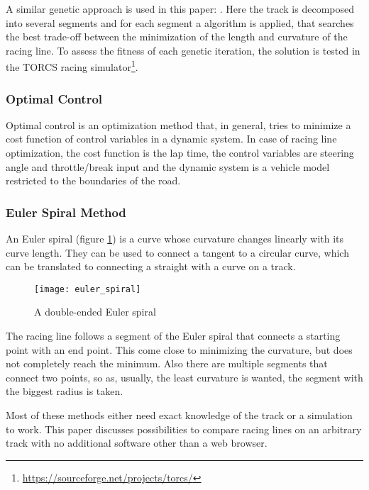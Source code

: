 A similar genetic approach is used in this paper: \cite{cardamone10}. Here the track is decomposed into several segments and for each segment a algorithm is applied, that searches the best trade-off between the minimization of the length and curvature of the racing line. To assess the fitness of each genetic iteration, the solution is tested in the TORCS racing simulator\footnote{\url{https://sourceforge.net/projects/torcs/}}.

\subsubsection{Optimal Control}
Optimal control is an optimization method that, in general, tries to minimize a cost function of control variables in a dynamic system. In case of racing line optimization, the cost function is the lap time, the control variables are steering angle and throttle/break input and the dynamic system is a vehicle model restricted to the boundaries of the road. \cite{gustafsson08,brayshaw05}

\subsubsection{Euler Spiral Method}
An Euler spiral (figure \ref{fig:euler_spiral}) is a curve whose curvature changes linearly with its curve length. They can be used to connect a tangent to a circular curve, which can be translated to connecting a straight with a curve on a track.\\ \cite{xiong09}

\begin{figure}[!ht]
	\centering
	\texttt{[image: euler\_spiral]}
	\caption{A double-ended Euler spiral}
	\label{fig:euler_spiral}
\end{figure}

The racing line follows a segment of the Euler spiral that connects a starting point with an end point. This come close to minimizing the curvature, but does not completely reach the minimum. Also there are multiple segments that connect two points, so as, usually, the least curvature is wanted, the segment with the biggest radius is taken.

Most of these methods either need exact knowledge of the track or a simulation to work. This paper discusses possibilities to compare racing lines on an arbitrary track with no additional software other than a web browser.

\clearpage